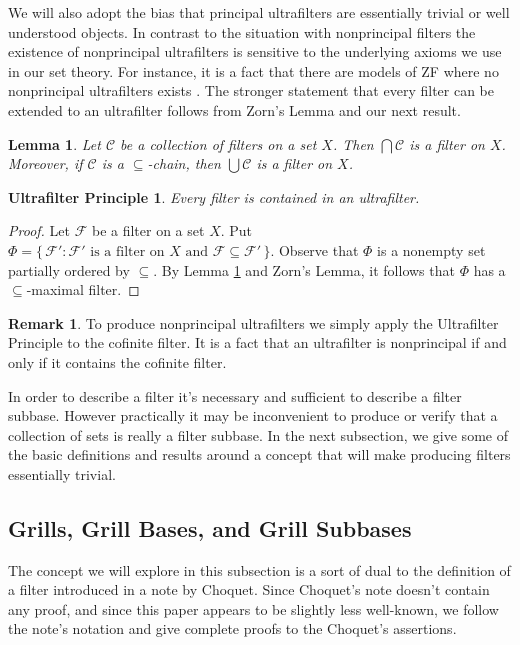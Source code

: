 \documentclass[12pt]{article}
\theoremstyle{plain}
\newtheorem{lem}[thm]{Lemma}
\newtheorem{up}[thm]{Ultrafilter Principle}
\theoremstyle{definition}
\newtheorem{rmk}[thm]{Remark}
\newcommand{\calC}{\mathcal{C}}
\newcommand{\calF}{\mathcal{F}}
\begin{document}
We will also adopt the bias that principal ultrafilters are
essentially trivial or well understood objects.
In contrast to the situation with nonprincipal filters the existence
of nonprincipal ultrafilters is sensitive to the underlying axioms we
use in our set theory.
For instance, it is a fact that there are models of ZF where no
nonprincipal ultrafilters exists \cite{Blass:1977fk}.
The stronger statement that every filter can be extended to an
ultrafilter follows from Zorn's Lemma and our next result.


\begin{lem}
  \label{lem:filterCh}
  Let $\calC$ be a collection of filters on a set $X$.
  Then $\bigcap\calC$ is a filter on $X$.
  Moreover, if $\calC$ is a \mbox{$\subseteq$-chain}, then
  $\bigcup\calC$ is a filter on $X$.
\end{lem}

\begin{up}
  Every filter is contained in an ultrafilter. 
\end{up}
\begin{proof}
  Let $\calF$ be a filter on a set $X$.
  Put $\Phi = \{\, \calF' : \mbox{$\calF'$ is a filter on $X$ and
    $\calF \subseteq \calF'$} \,\}$.
  Observe that $\Phi$ is a nonempty set partially ordered by
  $\subseteq$.
  By Lemma \ref{lem:filterCh} and Zorn's Lemma, it follows that $\Phi$
  has a \mbox{$\subseteq$-maximal} filter.
\end{proof}

\begin{rmk}
  To produce nonprincipal ultrafilters we simply apply the Ultrafilter
  Principle to the cofinite filter.  It is a fact that an ultrafilter
  is nonprincipal if and only if it contains the cofinite filter.
\end{rmk}

In order to describe a filter it's necessary and sufficient to
describe a filter subbase. 
However practically it may be inconvenient to produce or verify that a
collection of sets is really a filter subbase.
In the next subsection, we give some of the basic definitions and
results around a concept that will make producing filters essentially
trivial.

\subsection{Grills, Grill Bases, and Grill Subbases}
The concept we will explore in this subsection is a sort of dual to
the definition of a filter introduced in a note \cite{Choquet:1947uq}
by Choquet.  
Since Choquet's note doesn't contain any proof, and since this paper
appears to be slightly less well-known, we follow the note's notation
and give complete proofs to the Choquet's assertions.
\end{document}
